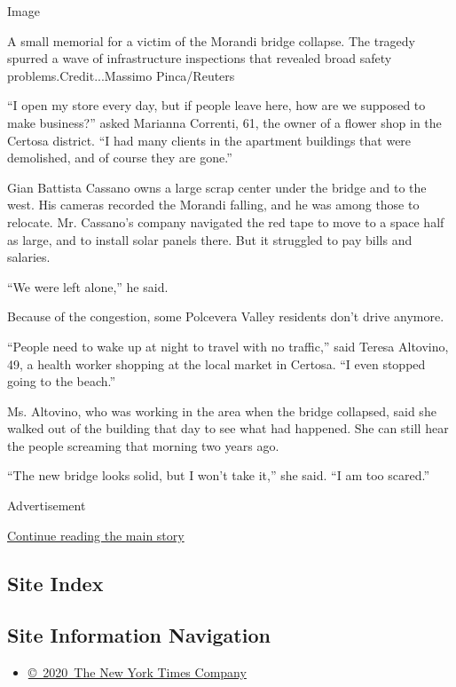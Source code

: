 Image

A small memorial for a victim of the Morandi bridge collapse. The
tragedy spurred a wave of infrastructure inspections that revealed broad
safety problems.Credit...Massimo Pinca/Reuters

``I open my store every day, but if people leave here, how are we
supposed to make business?'' asked Marianna Correnti, 61, the owner of a
flower shop in the Certosa district. ``I had many clients in the
apartment buildings that were demolished, and of course they are gone.''

Gian Battista Cassano owns a large scrap center under the bridge and to
the west. His cameras recorded the Morandi falling, and he was among
those to relocate. Mr. Cassano's company navigated the red tape to move
to a space half as large, and to install solar panels there. But it
struggled to pay bills and salaries.

``We were left alone,'' he said.

Because of the congestion, some Polcevera Valley residents don't drive
anymore.

``People need to wake up at night to travel with no traffic,'' said
Teresa Altovino, 49, a health worker shopping at the local market in
Certosa. ``I even stopped going to the beach.''

Ms. Altovino, who was working in the area when the bridge collapsed,
said she walked out of the building that day to see what had happened.
She can still hear the people screaming that morning two years ago.

``The new bridge looks solid, but I won't take it,'' she said. ``I am
too scared.''

Advertisement

\protect\hyperlink{after-bottom}{Continue reading the main story}

\hypertarget{site-index}{%
\subsection{Site Index}\label{site-index}}

\hypertarget{site-information-navigation}{%
\subsection{Site Information
Navigation}\label{site-information-navigation}}

\begin{itemize}
\tightlist
\item
  \href{https://help.nytimes3xbfgragh.onion/hc/en-us/articles/115014792127-Copyright-notice}{©~2020~The
  New York Times Company}
\end{itemize}

